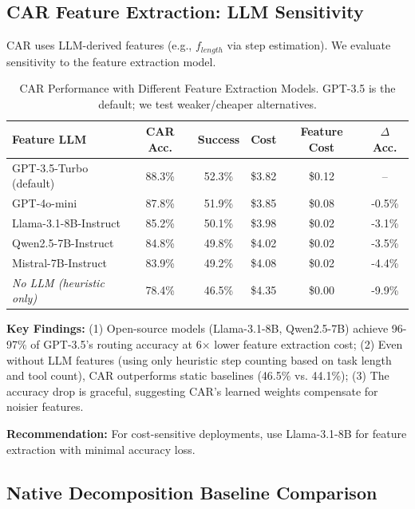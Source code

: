 \documentclass{article}
\theoremstyle{plain}
\theoremstyle{definition}
\theoremstyle{remark}
\begin{document}
\subsection{CAR Feature Extraction: LLM Sensitivity}
\label{sec:car_llm_sensitivity}

CAR uses LLM-derived features (e.g., $f_{length}$ via step estimation). We evaluate sensitivity to the feature extraction model.

\begin{table}[h]
	\caption{CAR Performance with Different Feature Extraction Models. GPT-3.5 is the default; we test weaker/cheaper alternatives.}
	\label{tab:car_feature_llm}
	\centering
	\small
	\begin{tabular}{@{}lccccc@{}}
		\toprule
		\textbf{Feature LLM} & \textbf{CAR Acc.} & \textbf{Success} & \textbf{Cost} & \textbf{Feature Cost} & \textbf{$\Delta$ Acc.} \\
		\midrule
		GPT-3.5-Turbo (default) & 88.3\% & 52.3\% & \$3.82 & \$0.12 & -- \\
		GPT-4o-mini & 87.8\% & 51.9\% & \$3.85 & \$0.08 & -0.5\% \\
		Llama-3.1-8B-Instruct & 85.2\% & 50.1\% & \$3.98 & \$0.02 & -3.1\% \\
		Qwen2.5-7B-Instruct & 84.8\% & 49.8\% & \$4.02 & \$0.02 & -3.5\% \\
		Mistral-7B-Instruct & 83.9\% & 49.2\% & \$4.08 & \$0.02 & -4.4\% \\
		\midrule
		\textit{No LLM (heuristic only)} & 78.4\% & 46.5\% & \$4.35 & \$0.00 & -9.9\% \\
		\bottomrule
	\end{tabular}
\end{table}

\textbf{Key Findings:} (1) Open-source models (Llama-3.1-8B, Qwen2.5-7B) achieve 96-97\% of GPT-3.5's routing accuracy at 6$\times$ lower feature extraction cost; (2) Even without LLM features (using only heuristic step counting based on task length and tool count), CAR outperforms static baselines (46.5\% vs. 44.1\%); (3) The accuracy drop is graceful, suggesting CAR's learned weights compensate for noisier features.

\textbf{Recommendation:} For cost-sensitive deployments, use Llama-3.1-8B for feature extraction with minimal accuracy loss.

\subsection{Native Decomposition Baseline Comparison}
\label{sec:native_decomposition}
\end{document}
